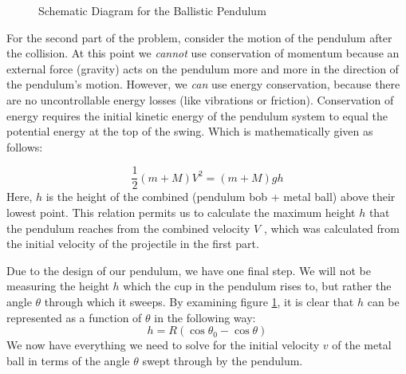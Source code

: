 \begin{figure}[h]
\begin{center}
    \end{center}
    \caption{Schematic Diagram for the Ballistic Pendulum}
    \label{fig:balldiag}
\end{figure}

For the second part of the problem, consider the motion of the pendulum after the collision. At this point we {\it{cannot}} use conservation of momentum because an external force (gravity) acts on the pendulum more and more in the direction of the pendulum's motion.  However, we {\it{can}} use energy conservation, because there are no uncontrollable energy losses (like vibrations or friction). Conservation of energy requires the initial kinetic energy of the pendulum system to equal the potential energy at the top of the swing. Which is mathematically given as follows:

\begin{equation}
    \frac{1}{2}(m+M)V^2 = (m+M)gh
\end{equation}
Here, $h$ is the height of the combined (pendulum bob + metal ball) above their lowest point.  This relation permits us to calculate the maximum height $h$ that the pendulum reaches from the combined velocity $V$ , which was calculated from the initial velocity of the projectile in the first part.\myskip

Due to the design of our pendulum, we have one final step.  We will not be measuring the height $h$ which the cup in the pendulum rises to, but rather the angle $\theta$ through which it sweeps.  By examining figure \ref{fig:balldiag}, it is clear that $h$ can be represented as a function of $\theta$ in the following way:
\begin{equation}
    h = R(\cos\theta_0-\cos\theta)
\end{equation}
We now have everything we need to solve for the initial velocity $v$ of the metal ball in terms of the angle $\theta$ swept through by the pendulum.\myskip

